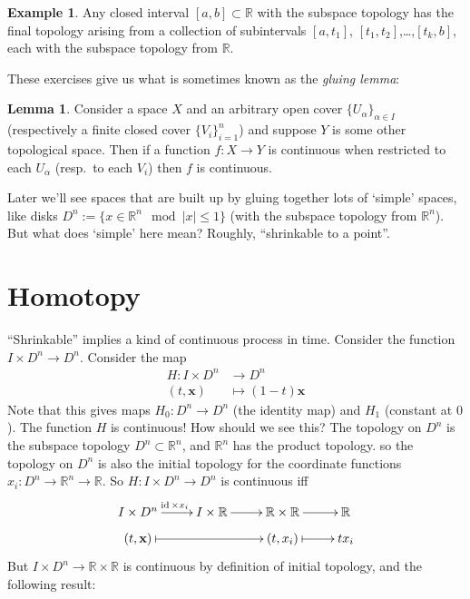 \documentclass{tufte-handout}
\def\RR{\mathbb{R}}
\DeclareMathOperator{\id}{id}
\theoremstyle{definition}
\newtheorem{lemma}{Lemma}
\newtheorem{example}{Example}
\begin{document}
\begin{example}\label{example:interval_final_topology}
Any closed interval $[a,b]\subset \RR$ with the subspace topology has the final topology 
arising from a collection of subintervals $[a,t_1]$, $[t_1,t_2]$,\ldots,$[t_k,b]$, each
with the subspace topology from $\RR$.
\end{example}

These exercises give us what is sometimes known as the \emph{gluing lemma}:

\begin{lemma}\label{lemma:gluing_lemma}
Consider a space $X$ and an arbitrary open cover $\{U_\alpha\}_{\alpha\in I}$ 
(respectively a finite closed cover $\{V_i\}_{i=1}^n$) and suppose $Y$ is some other 
topological space. Then if a function $f\colon X\to Y$ is continuous when restricted to each 
$U_\alpha$ (resp.\ to each $V_i$) then $f$ is continuous.
\end{lemma}

Later we'll see spaces that are built up by gluing together lots 
of `simple' spaces, like disks $D^n := \{x\in \RR^n\mod |x|\leq 1\}$ (with the subspace 
topology from $\RR^n$). But what does `simple' here mean? Roughly, ``shrinkable to a 
point''.

\section{Homotopy}

``Shrinkable'' implies a kind of continuous process in time. Consider the function $I\times D^n \to D^n$. Consider the map
\begin{align*}
	H\colon I \times D^n & \to D^n\\
	(t,\mathbf{x}) & \mapsto (1-t)\mathbf{x}
\end{align*}
Note that this gives maps $H_0\colon D^n\to D^n$ (the identity map) and $H_1$ (constant at $0$).
The function $H$ is continuous! 
How should we see this? 
The topology on $D^n$ is the subspace topology $D^n \subset \RR^n$,\marginnote{And $I\subset \RR$ has subspace topology}  and $\RR^n$ has the product topology. 
so the topology on $D^n$ is also the initial topology for the coordinate functions 
$x_i\colon D^n \to \RR^n \to \RR$. 
So $H\colon I\times D^n \to D^n$ is continuous iff
\[
	\xymatrix@R=0.5pc{
	I\times D^n \ar[r]^{\id\times x_i} & I\times \RR \ar[r]& \RR\times\RR \ar[r]& \RR\\
	(t,\mathbf{x}) \ar@{|->}[rr] && (t,x_i) \ar@{|->}[r] & tx_i 
	}
\]
But $I\times D^n \to \RR \times \RR$ is continuous by definition of initial topology, and the following result:
\end{document}
